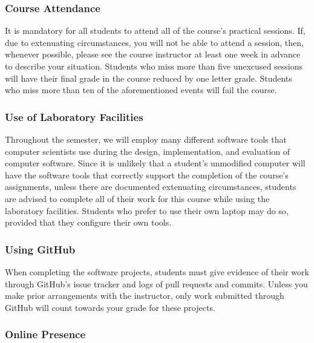 \documentclass[11pt]{article}
\begin{document}
\vspace*{-.1in}

\subsubsection*{Course Attendance}

It is mandatory for all students to attend all of the course's practical
sessions. If, due to extenuating circumstances, you will not be able to attend a
session, then, whenever possible, please see the course instructor at least one
week in advance to describe your situation. Students who miss more than five
unexcused sessions will have their final grade in the course reduced by one
letter grade. Students who miss more than ten of the aforementioned events will
fail the course.

\vspace*{-.05in}

\subsubsection*{Use of Laboratory Facilities}

Throughout the semester, we will employ many different software tools that
computer scientists use during the design, implementation, and evaluation of
computer software. Since it is unlikely that a student's unmodified computer
will have the software tools that correctly support the completion of the
course's assignments, unless there are documented extenuating circumstances,
students are advised to complete all of their work for this course while using
the laboratory facilities. Students who prefer to use their own laptop may do
so, provided that they configure their own tools.

\subsubsection*{Using GitHub}

When completing the software projects, students must give evidence of their work
through GitHub's issue tracker and logs of pull requests and commits. Unless you
make prior arrangements with the instructor, only work submitted through GitHub
will count towards your grade for these projects.

\subsubsection*{Online Presence}
\end{document}
